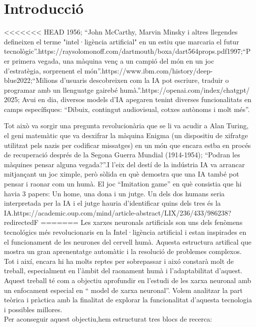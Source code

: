 \chapter{Introducció}
\label{c:intro}
<<<<<<< HEAD
1956; ``John McCarthy, Marvin Minsky i altres llegendes defineixen el terme "intel·ligència artificial" en un estiu que marcaria el futur tecnològic''.{https://raysolomonoff.com/dartmouth/boxa/dart564props.pdf}1997;``Per primera vegada, una màquina venç a un campió del món en un joc d'estratègia, sorprenent el món''.{https://www.ibm.com/history/deep-blue}2022;``Milions d'usuaris descobreixen com la IA pot escriure, traduir o programar amb un llenguatge gairebé humà.''.{https://openai.com/index/chatgpt/} 2025;  Avui en dia, diversos models d'IA apegaren tenint diverses funcionalitats en camps específiques: ``Dibuix, contingut audiovisual, cotxes autònoms i molt més''.

Tot això va sorgir una pregunta revolucionària que se li va acudir a Alan Turing, el geni matemàtic que va desxifrar la màquina Enigma (un dispositiu de xifratge utilitzat pels nazis per codificar missatges) en un món que encara estba en procés de recuperació després de la Segona Guerra Mundial (1914-1954); ``Podran les màquines pensar alguna vegada?''.I l'eix del destí de la indústria IA va arrancar mitjançant un joc ximple, però sòlida en què demostra que una IA també pot pensar i raonar com un humà. El joc ``Imitation game'' en què consistia que hi havia 3 papers: Un home, una dona i un jutge. Un dels dos humans seria interpretada per la IA i el jutge hauria d'identificar quins dels tres és la IA.{https://academic.oup.com/mind/article-abstract/LIX/236/433/986238?redirectedF}
=======
Les xarxes neuronals artificials son uns dels fenòmens tecnológics més revolucionaris en la Intel·ligència artificial i estan inspirades en el funcionament de les neurones del cervell humà. Aquesta estructura artifical que mostra un gran aprenentatge automàtic i la resolució de problemes complexos. Tot i així, encara hi ha molts reptes per sobrepassar i aixó constarà molt de treball, especialment en l'àmbit del raonament humà i l'adaptabilitat d'aquest.\\
Aquest treball té com a objectiu aprofundir en l'estudi de les xarxa neuronal amb un enfocament especial en `` model de xarxa neuronal''. Volem analitzar la part teòrica i pràctica amb la finalitat de explorar la funcionalitat d'aquesta tecnologia i possibles millores.\\
Per aconseguir aquest objectiu,hem estructurat tres blocs de recerca:
